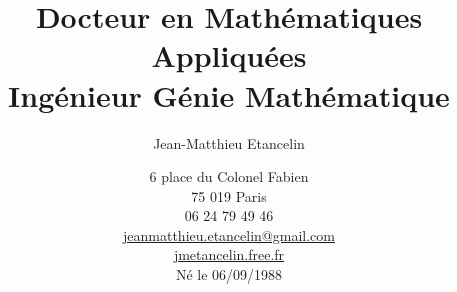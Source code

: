 
\title{Docteur en Mathématiques Appliquées\\ Ingénieur Génie Mathématique}
\author{Jean-Matthieu Etancelin}
\date{6 place du Colonel Fabien\\ 75 019 Paris\\ 06 24 79 49
46\\  \href{mailto:jeanmatthieu.etancelin@gmail.com}{jeanmatthieu.etancelin@gmail.com}\\ \href{jmetancelin.free.fr}{jmetancelin.free.fr}\\ Né le 06/09/1988}

